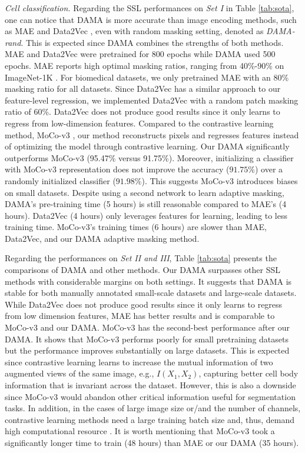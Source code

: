 \documentclass[10pt,twocolumn,letterpaper]{article}
\begin{document}
\textcolor{nblue}{\textit{Cell classification.}} 
Regarding the SSL performances on \textit{Set I} in Table \ref{tab:sota}, one can notice that DAMA is more accurate than image encoding methods, such as MAE \cite{mae} and Data2Vec \cite{data2vec}, even with random masking setting, denoted as \textit{DAMA-rand}. This is expected since DAMA combines the strengths of both methods. MAE and Data2Vec were pretrained for 800 epochs while DAMA used 500 epochs. MAE reports high optimal masking ratios, ranging from 40\%-90\% on ImageNet-1K \cite{imagenet}. For biomedical datasets, we only pretrained MAE with an 80\% masking ratio for all datasets. Since Data2Vec has a similar approach to our feature-level regression, we implemented Data2Vec with a random patch masking ratio of 60\%. Data2Vec does not produce good results since it only learns to regress from low-dimension features.
Compared to the contrastive learning method, MoCo-v3 \cite{mocov3}, our method reconstructs pixels and regresses features instead of optimizing the model through contrastive learning. Our DAMA significantly outperforms MoCo-v3 (95.47\% versus 91.75\%). Moreover, initializing a classifier with MoCo-v3 representation does not improve the accuracy ($91.75\%$) over a randomly initialized classifier ($91.98\%$). This suggests MoCo-v3 introduces biases on small datasets. Despite using a second network to learn adaptive masking, DAMA's pre-training time (5 hours) is still reasonable compared to MAE's (4 hours). Data2Vec (4 hours) only leverages features for learning, leading to less training time. MoCo-v3's training times (6 hours) are slower than MAE, Data2Vec, and our DAMA adaptive masking method.

Regarding the performances on \textit{Set II and III}, Table \ref{tab:sota} presents the comparisons of DAMA and other methods. Our DAMA surpasses other SSL methods with considerable margins on both settings. It suggests that DAMA is stable for both manually annotated small-scale datasets and large-scale datasets. While Data2Vec \cite{data2vec} does not produce good results since it only learns to regress from low dimension features, MAE \cite{mae} has better results and is comparable to MoCo-v3 \cite{mocov3} and our DAMA. MoCo-v3 has the second-best performance after our DAMA. It shows that MoCo-v3 performs poorly for small pretraining datasets but the performance improves substantially on large datasets. This is expected since contrastive learning learns to increase the mutual information of two augmented views of the same image, e.g., $I(X_1,X_2)$, capturing better cell body information that is invariant across the dataset. However, this is also a downside since MoCo-v3 would abandon other critical information useful for segmentation tasks. In addition, in the cases of large image size or/and the number of channels, contrastive learning methods need a large training batch size and, thus, demand high computational resource \cite{ssl2,byol,simclr,moco,mocov3}. It is worth mentioning that MoCo-v3 took a significantly longer time to train (48 hours) than MAE \cite{mae} or our DAMA (35 hours).
\end{document}
